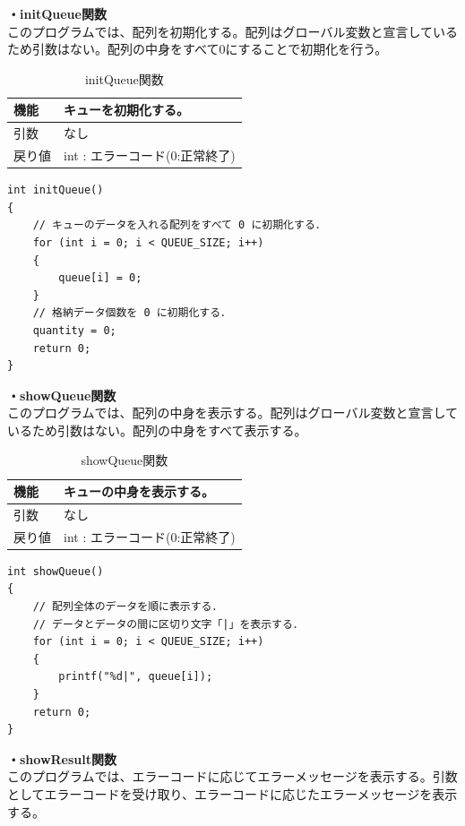 \documentclass[dvipdfmx]{jsarticle}
\begin{document}
\textbf{・initQueue関数}\\
このプログラムでは、配列を初期化する。配列はグローバル変数と宣言しているため引数はない。配列の中身をすべて0にすることで初期化を行う。
\begin{table}[ht]
  \centering
  \caption{initQueue関数}
  \begin{tabular}{|p{5cm}|p{10cm}|}
    \hline
    機能  & キューを初期化する。                                      \\
    \hline
    引数  & なし \\
    \hline
    戻り値 & int : エラーコード(0:正常終了) \\
    \hline
  \end{tabular}
  \label{tab:initQueue_func}
\end{table}
\begin{lstlisting}[caption={initQueue関数}, label={lst:initQueue_func}]
int initQueue()
{
    // キューのデータを入れる配列をすべて 0 に初期化する．
    for (int i = 0; i < QUEUE_SIZE; i++)
    {
        queue[i] = 0;
    }
    // 格納データ個数を 0 に初期化する．
    quantity = 0;
    return 0;
}
\end{lstlisting}
\textbf{・showQueue関数}\\
このプログラムでは、配列の中身を表示する。配列はグローバル変数と宣言しているため引数はない。配列の中身をすべて表示する。
\begin{table}[ht]
  \centering
  \caption{showQueue関数}
  \begin{tabular}{|p{5cm}|p{10cm}|}
    \hline
    機能  & キューの中身を表示する。                                      \\
    \hline
    引数  & なし \\
    \hline
    戻り値 & int : エラーコード(0:正常終了) \\
    \hline
  \end{tabular}
  \label{tab:showQueue_func}
\end{table}
\begin{lstlisting}[caption={showQueue関数}, label={lst:showQueue_func}]
int showQueue()
{
    // 配列全体のデータを順に表示する．
    // データとデータの間に区切り文字「|」を表示する．
    for (int i = 0; i < QUEUE_SIZE; i++)
    {
        printf("%d|", queue[i]);
    }
    return 0;
}
\end{lstlisting}
\textbf{・showResult関数}\\
このプログラムでは、エラーコードに応じてエラーメッセージを表示する。引数としてエラーコードを受け取り、エラーコードに応じたエラーメッセージを表示する。
\end{document}
